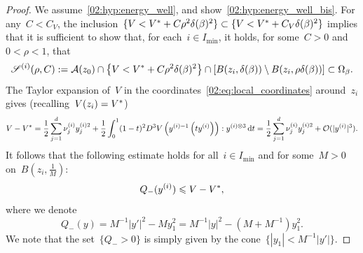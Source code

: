             \begin{proof}
                We assume~\eqref{02:hyp:energy_well}, and show~\eqref{02:hyp:energy_well_bis}.
                For any~$C<C_V$, the inclusion~$\{V<V^* + C\rho^2\delta(\beta)^2\}\subset \{V<V^* + C_V\delta(\beta)^2\}$ implies that it is sufficient to show that, for each~$i\in I_{\min}$, it holds, for some~$C>0$ and~$0<\rho<1$, that
                \begin{equation}
                \label{02:eq:delta_reduction_inclusion}
                \mathscr S^{(i)}(\rho,C):=\mathcal{A}(z_0)\cap\left\{V<V^*+C \rho^2\delta(\beta)^2\right\}\cap\left[B(z_i,\delta(\beta))\setminus B(z_i,\rho\delta(\beta))\right]\subset \Omega_\beta.
                \end{equation}
                The Taylor expansion of~$V$ in the coordinates~\eqref{02:eq:local_coordinates} around~$z_i$ gives (recalling~$V(z_i)=V^*$)
                \begin{equation}
                    \label{02:eq:V_local}
                        V - V^* = \frac12\sum_{j=1}^d \nu^{(i)}_{j}y^{(i)2}_j + \frac12 \int_0^1 (1-t)^2 D^3 V\left(y^{(i)-1}\left(ty^{(i)}\right)\right):y^{(i)\otimes 3}\,\mathrm{d} t = \frac12\sum_{j=1}^d \nu^{(i)}_{j}y^{(i)2}_j + \mathcal{O}(|y^{(i)}|^3).
                    \end{equation}
                    It follows that the following estimate holds for all~$i\in I_{\min}$ and for some~$M>0$ on~$B(z_i,\frac1M)$:
                    \begin{equation}
                        \label{02:eq:quadratic_estimate}
                        Q_{-}(y^{(i)}) \leq V-\Vstar,%
                    \end{equation}
                    where we denote
                    \begin{equation}
                        \label{02:eq:quadratic_forms}
                        Q_{-}(y) = M^{- 1}|y'|^2 - M y_1^2 = M^{-1}|y|^2 - (M+M^{-1})y_1^2.
                    \end{equation}
                    We note that the set~$\{Q_{-}>0\}$ is simply given by the cone~$\{|y_1| <  M^{-1}|y'|\}$.


\end{proof}
